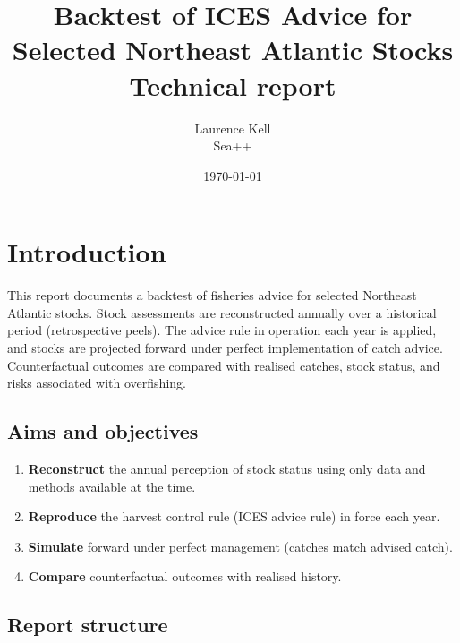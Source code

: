 \documentclass[11pt,a4paper]{extarticle}
\title{Backtest of ICES Advice for Selected Northeast Atlantic Stocks\\
\large Technical report}
\author{%
  Laurence Kell\\
  \small Sea++
}
\date{\small \today}
\begin{document}
\maketitle

\begin{abstract}
\noindent
{}
\end{abstract}

\tableofcontents
\newpage

\section{Introduction}
\label{sec:intro}


This report documents a backtest of fisheries advice for selected Northeast
Atlantic stocks. Stock assessments are reconstructed annually over a historical
period (retrospective peels). The advice rule in operation each year is applied,
and stocks are projected forward under perfect implementation of catch advice.
Counterfactual outcomes are compared with realised catches, stock status, and
risks associated with overfishing.

\subsection{Aims and objectives}

\begin{enumerate}
  \item \textbf{Reconstruct} the annual perception of stock status using only
        data and methods available at the time.
  \item \textbf{Reproduce} the harvest control rule (ICES advice rule) in force
        each year.
  \item \textbf{Simulate} forward under perfect management (catches match
        advised catch).
  \item \textbf{Compare} counterfactual outcomes with realised history.
\end{enumerate}

\subsection{Report structure}
\end{document}
